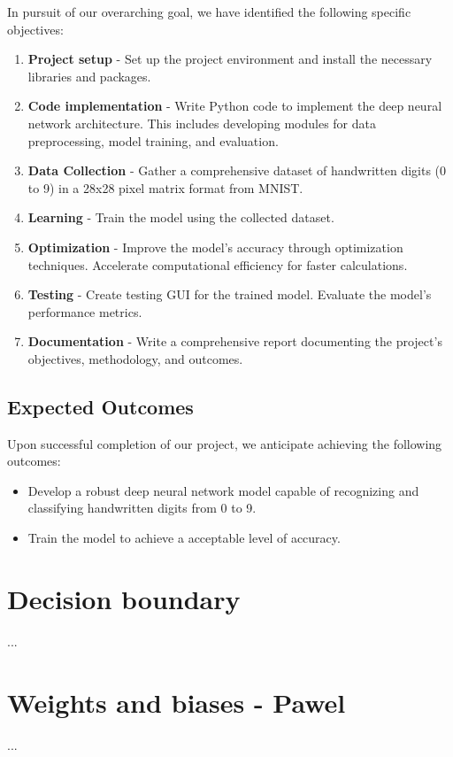\documentclass{article}
\begin{document}
In pursuit of our overarching goal, we have identified the following specific objectives:

\begin{enumerate}
    \item \textbf{Project setup} - Set up the project environment and install the necessary libraries and packages.
    \item \textbf{Code implementation} - Write Python code to implement the deep neural network architecture. This includes developing modules for data preprocessing, model training, and evaluation.
    \item \textbf{Data Collection} - Gather a comprehensive dataset of handwritten digits (0 to 9) in a 28x28 pixel matrix format from MNIST.
	\item \textbf{Learning} - Train the model using the collected dataset. 
	\item \textbf{Optimization} - Improve the model's accuracy through optimization techniques. Accelerate computational efficiency for faster calculations.
    \item \textbf{Testing} - Create testing GUI for the trained model. Evaluate the model's performance metrics.
	\item \textbf{Documentation} - Write a comprehensive report documenting the project's objectives, methodology, and outcomes.
\end{enumerate}

\subsection{Expected Outcomes}

Upon successful completion of our project, we anticipate achieving the following outcomes:

\begin{itemize}
    \item Develop a robust deep neural network model capable of recognizing and classifying handwritten digits from 0 to 9.
    \item Train the model to achieve a acceptable level of accuracy.
\end{itemize}

\section{Decision boundary }
...

\section{Weights and biases - Pawel}
...
\end{document}
